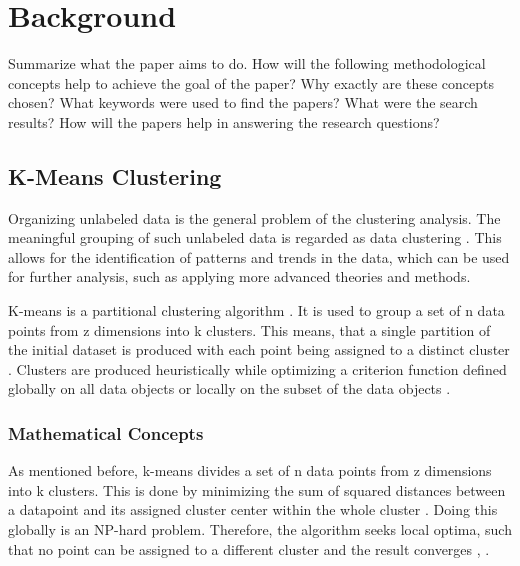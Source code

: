 \chapter{Background}
\label{cha:background}

Summarize what the paper aims to do.
How will the following methodological concepts help to achieve the goal of the paper?
Why exactly are these concepts chosen?
What keywords were used to find the papers?
What were the search results?
How will the papers help in answering the research questions?





%

\section{K-Means Clustering}
\label{sec:k_means_clustering}
Organizing unlabeled data \cite{EZU-CPF} is the general problem of the clustering analysis.
The meaningful grouping of such unlabeled data is regarded as data clustering \cite{ABI-RKC}.
This allows for the identification of patterns and trends in the data, which can be used for further analysis, such as applying more advanced theories and methods.

K-means is a partitional clustering algorithm \cite{SIN-UKC}.
It is used to group a set of n data points from z dimensions into k clusters.
This means, that a single partition of the initial dataset is produced with each point being assigned to a distinct cluster \cite{SIN-UKC}.
Clusters are produced heuristically while optimizing a criterion function defined globally on all data objects or locally on the subset of the data objects \cite{ZHU-EPC}.

\subsection{Mathematical Concepts}
As mentioned before, k-means divides a set of n data points from z dimensions into k clusters.
This is done by minimizing the sum of squared distances between a datapoint and its assigned cluster center within the whole cluster \cite{HAR-KMA}.
Doing this globally is an NP-hard problem.
Therefore, the algorithm seeks local optima, such that no point can be assigned to a different cluster and the result converges \cite{SEL-GCT}, \cite{HAR-KMA}.


